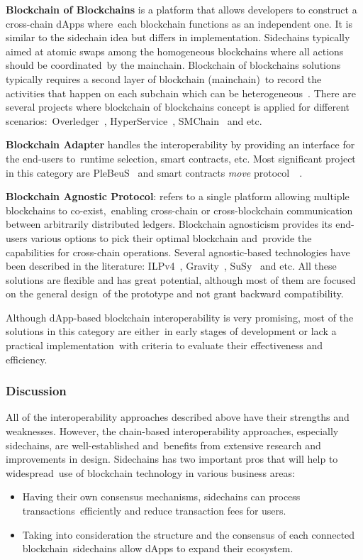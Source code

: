 \textbf{Blockchain of Blockchains} is a platform that allows developers to construct a cross-chain dApps where\
each blockchain functions as an independent one.
It is similar to the sidechain idea but differs in implementation.
Sidechains typically aimed at atomic swaps among the homogeneous blockchains where all actions should be coordinated\
by the mainchain.
Blockchain of blockchains solutions typically requires a second layer of blockchain (mainchain)\
to record the activities that happen on each subchain which can be heterogeneous~\cite{cryptoeprint:2021/537}.
There are several projects where blockchain of blockchains concept is applied for different scenarios:\
Overledger~\cite{Verdian2018}, HyperService~\cite{Liu2019}, SMChain~\cite{cryptoeprint:2019/1401} and etc.

\textbf{Blockchain Adapter} handles the interoperability by providing an interface for the end-users to\
runtime selection, smart contracts, etc.
Most significant project in this category are PleBeuS~\cite{Scheid2020} and smart contracts \emph{move} protocol\
~\cite{Fynn2020}.

\textbf{Blockchain Agnostic Protocol}: refers to a single platform allowing multiple blockchains to co-exist,\
enabling cross-chain or cross-blockchain communication between arbitrarily distributed ledgers.
Blockchain agnosticism provides its end-users various options to pick their optimal blockchain and\
provide the capabilities for cross-chain operations.
Several agnostic-based technologies have been described in the literature: ILPv4~\cite{InterledgerV4},
Gravity~\cite{PupyshevGravity2020}, SuSy~\cite{PupyshevSuSy2020} and etc.
All these solutions are flexible and has great potential, although most of them are focused on the general design\
of the prototype and not grant backward compatibility.

Although dApp-based blockchain interoperability is very promising, most of the solutions in this category are either\
in early stages of development or lack a practical implementation\
with criteria to evaluate their effectiveness and efficiency.

\subsubsection{Discussion}

All of the interoperability approaches described above have their strengths and weaknesses.
However, the chain-based interoperability approaches, especially sidechains, are well-established and\
benefits from extensive research and improvements in design.
Sidechains has two important pros that will help to widespread\
use of blockchain technology in various business areas:
\begin{itemize}
    \item Having their own consensus mechanisms, sidechains can process transactions\
    efficiently and reduce transaction fees for users.
    \item Taking into consideration the structure and the consensus of each connected blockchain\
    sidechains allow dApps to expand their ecosystem.
\end{itemize}

